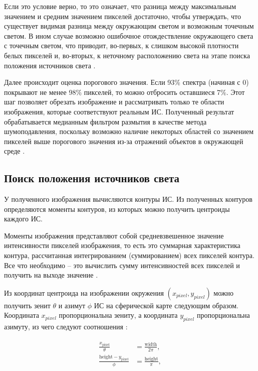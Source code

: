 Если это условие верно, то это означает, что разница между максимальным значением и средним значением пикселей достаточно, чтобы утверждать, что существует видимая разница между окружающим светом и возможным точечным светом. В ином случае возможно ошибочное отождествление окружающего света с точечным светом, что приводит, во-первых, к слишком высокой плотности белых пикселей и, во-вторых, к неточному расположению света на этапе поиска положения источников света \cite{osti2019real}.

Далее происходит оценка порогового значения. Если 93\% спектра (начиная с 0) покрывают не менее 98\% пикселей, то можно отбросить оставшиеся 7\%. Этот шаг позволяет обрезать изображение и рассматривать только те области изображения, которые соответствуют реальным ИС. Полученный результат обрабатывается медианным фильтром размытия в качестве метода шумоподавления, поскольку возможно наличие некоторых областей со значением пикселей выше порогового значения из-за отражений объектов в окружающей среде \cite{osti2019real}.

\subsection{Поиск положения источников света}

У полученного изображения вычисляются контуры ИС. Из полученных контуров определяются моменты контуров, из которых можно получить центроиды каждого ИС. 

Моменты изображения представляют собой средневзвешенное значение интенсивности пикселей изображения, то есть это суммарная характеристика контура, рассчитанная интегрированием (суммированием) всех пикселей контура. Все что необходимо -- это вычислить сумму интенсивностей всех пикселей и получить на выходе значение \cite{sns_tras}.

Из координат центроида на изображении окружения $(x_{pixel}, y_{pixel})$ можно получить зенит $\theta$ и азимут $\phi$ ИС на сферической карте следующим образом. Координата $x_{pixel}$ пропорциональна зениту, а координата $y_{pixel}$ пропорциональна азимуту, из чего следуют соотношения \cite{osti2019real}:

\begin{equation}
	\begin{aligned}
		\begin{split}
			\frac{x_{\text{pixel}}}{\theta} &= \frac{\text{width}}{2\pi}, \\
			\frac{\text{height} - y_{\text{pixel}}}{\phi} &= \frac{\text{height}}{\pi}, 
		\end{split}
	\end{aligned}
\end{equation}


